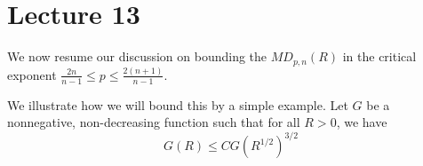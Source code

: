 \section{Lecture 13}

We now resume our discussion on bounding the $MD_{p,n}(R)$ in the critical exponent $\frac{2n}{n-1}\leq p\leq\frac{2(n+1)}{n-1}$.

We illustrate how we will bound this by a simple example.
Let $G$ be a nonnegative, non-decreasing function such that for all $R>0$, we have
\begin{equation*}
    G(R)\leq CG(R^{1/2})^{3/2}
\end{equation*}